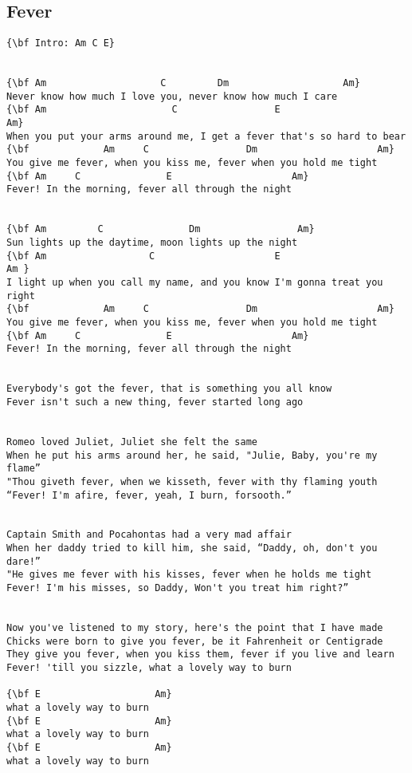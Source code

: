 \documentclass[a4paper]{article}
\begin{document}
\subsection{Fever} %
\label{sub:Fever}
\begin{Verbatim}[commandchars=\\\{\}]
{\bf Intro: Am C E}


{\bf Am                    C         Dm                    Am}
Never know how much I love you, never know how much I care
{\bf Am                      C                 E                       Am}
When you put your arms around me, I get a fever that's so hard to bear
{\bf             Am     C                 Dm                     Am}
You give me fever, when you kiss me, fever when you hold me tight
{\bf Am     C               E                     Am}
Fever! In the morning, fever all through the night


{\bf Am         C               Dm                 Am}
Sun lights up the daytime, moon lights up the night
{\bf Am                  C                     E                        Am }
I light up when you call my name, and you know I'm gonna treat you right
{\bf             Am     C                 Dm                     Am}
You give me fever, when you kiss me, fever when you hold me tight
{\bf Am     C               E                     Am}
Fever! In the morning, fever all through the night


Everybody's got the fever, that is something you all know
Fever isn't such a new thing, fever started long ago


Romeo loved Juliet, Juliet she felt the same
When he put his arms around her, he said, "Julie, Baby, you're my flame”
"Thou giveth fever, when we kisseth, fever with thy flaming youth
“Fever! I'm afire, fever, yeah, I burn, forsooth.”


Captain Smith and Pocahontas had a very mad affair
When her daddy tried to kill him, she said, “Daddy, oh, don't you dare!”
"He gives me fever with his kisses, fever when he holds me tight
Fever! I'm his misses, so Daddy, Won't you treat him right?”


Now you've listened to my story, here's the point that I have made
Chicks were born to give you fever, be it Fahrenheit or Centigrade
They give you fever, when you kiss them, fever if you live and learn
Fever! 'till you sizzle, what a lovely way to burn

{\bf E                    Am}
what a lovely way to burn
{\bf E                    Am}
what a lovely way to burn
{\bf E                    Am}
what a lovely way to burn
\end{Verbatim}
\newpage
\end{document}

